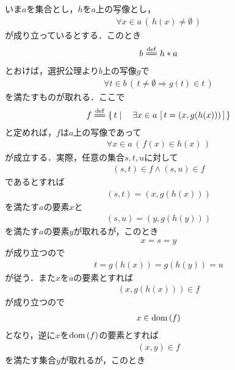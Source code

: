 	\begin{sketch}
		いま$a$を集合とし，$h$を$a$上の写像とし，
		\begin{align}
			\forall x \in a\, (\, h(x) \neq \emptyset\, )
			\label{fom:thm_direct_product_of_non_empty_sets_is_not_empty_1}
		\end{align}
		が成り立っているとする．このとき
		\begin{align}
			b \defeq h \ast a
		\end{align}
		とおけば，選択公理より$b$上の写像$g$で
		\begin{align}
			\forall t \in b\, \left(\, t \neq \emptyset \Longrightarrow g(t) \in t\, \right)
			\label{fom:thm_direct_product_of_non_empty_sets_is_not_empty_2}
		\end{align}
		を満たすものが取れる．ここで
		\begin{align}
			f \defeq \Set{t}{\exists x \in a\, \left[\, t = (x,g(h(x)))\, \right]}
		\end{align}
		と定めれば，$f$は$a$上の写像であって
		\begin{align}
			\forall x \in a\, \left(\, f(x) \in h(x)\, \right)
		\end{align}
		が成立する．実際，任意の集合$s,t,u$に対して
		\begin{align}
			(s,t) \in f \wedge (s,u) \in f
		\end{align}
		であるとすれば
		\begin{align}
			(s,t) = (x,g(h(x)))
		\end{align}
		を満たす$a$の要素$x$と
		\begin{align}
			(s,u) = (y,g(h(y)))
		\end{align}
		を満たす$a$の要素$y$が取れるが，このとき
		\begin{align}
			x = s = y
		\end{align}
		が成り立つので
		\begin{align}
			t = g(h(x)) = g(h(y)) = u
		\end{align}
		が従う．また$x$を$a$の要素とすれば
		\begin{align}
			(x,g(h(x))) \in f
		\end{align}
		が成り立つので
		\begin{align}
			x \in \operatorname*{dom} \left(f\right)
		\end{align}
		となり，逆に$x$を$\operatorname*{dom} \left(f\right)$の要素とすれば
		\begin{align}
			(x,y) \in f
		\end{align}
		を満たす集合$y$が取れるが，このとき
		\begin{align}

\end{align}
\end{sketch}

